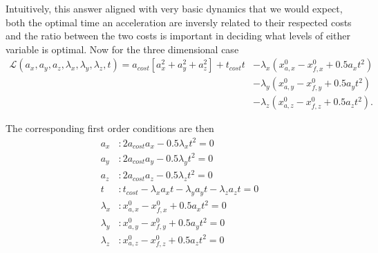 \documentclass[11pt,english]{article}
\begin{document}
Intuitively, this answer aligned with very basic dynamics that we would expect, both the optimal time an acceleration are inversly related to their respected costs and the ratio between the two costs is important in deciding what levels of either variable is optimal. Now for the three dimensional case 
\begin{align*}
	\mathcal{L}(a_x,a_y,a_z,\lambda_x,\lambda_y,\lambda_z, t) = a_{cost}\left[a_x^2 + a_y^2 + a_z^2\right] + t_{cost}t &- \lambda_x(x_{a,x}^0 - x_{f,x}^0 + 0.5a_xt^2)\\ &- \lambda_y(x_{a,y}^0 - x_{f,y}^0 + 0.5a_yt^2)\\ &- \lambda_z(x_{a,z}^0 - x_{f,z}^0 + 0.5a_zt^2).
\end{align*}

The corresponding first order conditions are then
\begin{align*}
a_x&: 2a_{cost}a_x - 0.5\lambda_xt^2 = 0\\
a_y&: 2a_{cost}a_y - 0.5\lambda_yt^2 = 0\\
a_z&: 2a_{cost}a_z - 0.5\lambda_zt^2 = 0\\
t&: t_{cost} - \lambda_x a_xt - \lambda_y a_yt - \lambda_z a_zt =0\\ 
\lambda_x&: x_{a,x}^0 - x_{f,x}^0 + 0.5a_xt^2 = 0\\
\lambda_y&: x_{a,y}^0 - x_{f,y}^0 + 0.5a_yt^2 = 0\\
\lambda_z&: x_{a,z}^0 - x_{f,z}^0 + 0.5a_zt^2 = 0
\end{align*}
\end{document}
